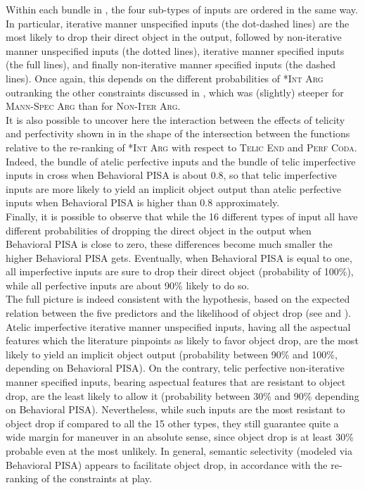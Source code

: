 Within each bundle in , the four sub-types of inputs are ordered in the same way. In particular, iterative manner unspecified inputs (the dot-dashed lines) are the most likely to drop their direct object in the output, followed by non-iterative manner unspecified inputs (the dotted lines), iterative manner specified inputs (the full lines), and finally non-iterative manner specified inputs (the dashed lines). Once again, this depends on the different probabilities of \textsc{*Int Arg} outranking the other constraints discussed in , which was (slightly) steeper for \textsc{Mann-Spec Arg} than for \textsc{Non-Iter Arg}.\\
It is also possible to uncover here the interaction between the effects of telicity and perfectivity shown in  in the shape of the intersection between the functions relative to the re-ranking of \textsc{*Int Arg} with respect to \textsc{Telic End} and \textsc{Perf Coda}. Indeed, the bundle of atelic perfective inputs and the bundle of telic imperfective inputs in  cross when Behavioral PISA is about 0.8, so that telic imperfective inputs are more likely to yield an implicit object output than atelic perfective inputs when Behavioral PISA is higher than 0.8 approximately.\\
Finally, it is possible to observe that while the 16 different types of input all have different probabilities of dropping the direct object in the output when Behavioral PISA is close to zero, these differences become much smaller the higher Behavioral PISA gets. Eventually, when Behavioral PISA is equal to one, all imperfective inputs are sure to drop their direct object (probability of 100\%), while all perfective inputs are about 90\% likely to do so.\\
The full picture is indeed consistent with the hypothesis, based on the expected relation between the five predictors and the likelihood of object drop (see  and ). Atelic imperfective iterative manner unspecified inputs, having all the aspectual features which the literature pinpoints as likely to favor object drop, are the most likely to yield an implicit object output (probability between 90\% and 100\%, depending on Behavioral PISA). On the contrary, telic perfective non-iterative manner specified inputs, bearing aspectual features that are resistant to object drop, are the least likely to allow it (probability between 30\% and 90\% depending on Behavioral PISA). Nevertheless, while such inputs are the most resistant to object drop if compared to all the 15 other types, they still guarantee quite a wide margin for maneuver in an absolute sense, since object drop is at least 30\% probable even at the most unlikely. In general, semantic selectivity (modeled via Behavioral PISA) appears to facilitate object drop, in accordance with the re-ranking of the constraints at play.


